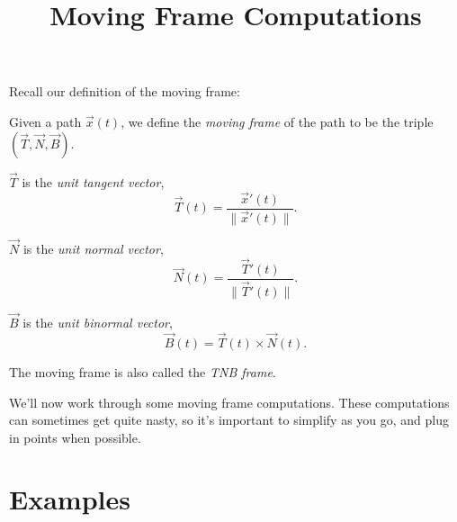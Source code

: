 \documentclass{ximera}
\title{Moving Frame Computations}
\begin{document}
\begin{abstract}
\end{abstract}
\maketitle

Recall our definition of the moving frame:

\begin{definition}
Given a path $\vec{x}(t)$, we define the \emph{moving frame} of the path to be the triple $(\vec{T},\vec{N},\vec{B})$.

$\vec{T}$ is the \emph{unit tangent vector},
\[
\vec{T}(t) = \dfrac{\vec{x}'(t)}{\|\vec{x}'(t)\|}.
\]

$\vec{N}$ is the \emph{unit normal vector},
\[
\vec{N}(t) = \dfrac{\vec{T}'(t)}{\|\vec{T}'(t)\|}.
\]

$\vec{B}$ is the \emph{unit binormal vector},
\[
\vec{B}(t) = \vec{T}(t)\times\vec{N}(t).
\] 

The moving frame is also called the \emph{TNB frame}.
\end{definition}

We'll now work through some moving frame computations. These computations can sometimes get quite nasty, so it's important to simplify as you go, and plug in points when possible.

\section*{Examples}
\end{document}
